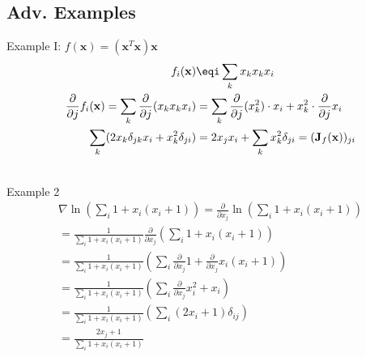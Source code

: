 \subsection{Adv. Examples} Example I: $f(\mathbf{x}) = (\mathbf{x}^T\mathbf{x})\mathbf{x}$
\begin{align*}
f_i(\mathbf{x}) &\eqi \sum_{k}x_kx_kx_i \\
\frac{\partial}{\partial j}f_i(\mathbf{x}) = \sum_{k}\frac{\partial}{\partial j}(x_kx_kx_i) &= \sum_{k}\frac{\partial}{\partial j}(x_k^2)\cdot x_i + x_k^2\cdot \frac{\partial}{\partial j} x_i \\
\sum_{k}(2x_k\delta_{jk}x_i + x_k^2\delta_{ji}) &= 2x_jx_i + \sum_{k}x_k^2\delta_{ji} = (\mathbf{J}_f(\mathbf{x}))_{ji}
\end{align*}


~\\
Example 2
\begin{align*}
	\nabla\ln\left(\sum_{i}1 + x_i(x_i +1)\right) = \frac{\partial}{\partial x_j}\ln\left(\sum_{i}1 + x_i(x_i +1)\right) \\
	= \frac{1}{\sum_{i}1 + x_i(x_i + 1)} \frac{\partial}{\partial x_j}\left(\sum_{i} 1 + x_i(x_i + 1)\right)\\
	= \frac{1}{\sum_{i}1 + x_i(x_i + 1)} \left(\sum_{i}\frac{\partial}{\partial x_j} 1 + \frac{\partial}{\partial x_j}x_i(x_i + 1)\right)\\
	= \frac{1}{\sum_{i}1 + x_i(x_i + 1)} \left(\sum_{i}\frac{\partial}{\partial x_j}x_i^2 + x_i\right)\\
	= \frac{1}{\sum_{i}1 + x_i(x_i + 1)} \left(\sum_{i}(2x_i + 1)\delta_{ij}\right)\\
	= \frac{2x_j + 1}{\sum_{i}1 + x_i(x_i + 1)}\\
\end{align*}

